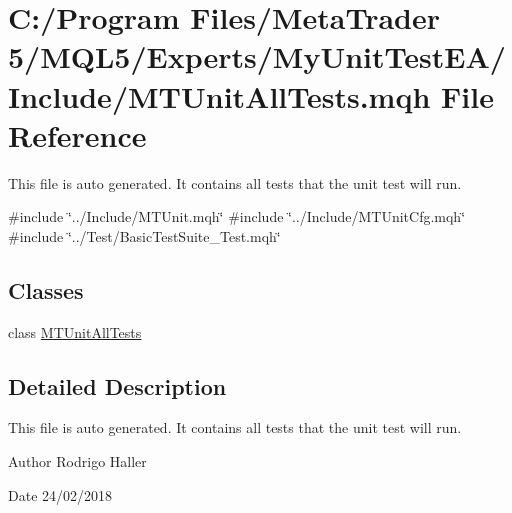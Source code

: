 \hypertarget{_m_t_unit_all_tests_8mqh}{}\section{C\+:/\+Program Files/\+Meta\+Trader 5/\+M\+Q\+L5/\+Experts/\+My\+Unit\+Test\+E\+A/\+Include/\+M\+T\+Unit\+All\+Tests.mqh File Reference}
\label{_m_t_unit_all_tests_8mqh}


This file is auto generated. It contains all tests that the unit test will run.  


{\ttfamily \#include \char`\"{}../\+Include/\+M\+T\+Unit.\+mqh\char`\"{}}\newline
{\ttfamily \#include \char`\"{}../\+Include/\+M\+T\+Unit\+Cfg.\+mqh\char`\"{}}\newline
{\ttfamily \#include \char`\"{}../\+Test/\+Basic\+Test\+Suite\+\_\+\+Test.\+mqh\char`\"{}}\newline
\subsection*{Classes}
\begin{DoxyCompactItemize}
\item 
class \mbox{\hyperlink{class_m_t_unit_all_tests}{M\+T\+Unit\+All\+Tests}}
\end{DoxyCompactItemize}


\subsection{Detailed Description}
This file is auto generated. It contains all tests that the unit test will run. 

\begin{DoxyAuthor}{Author}
Rodrigo Haller 
\end{DoxyAuthor}
\begin{DoxyDate}{Date}
24/02/2018 
\end{DoxyDate}
